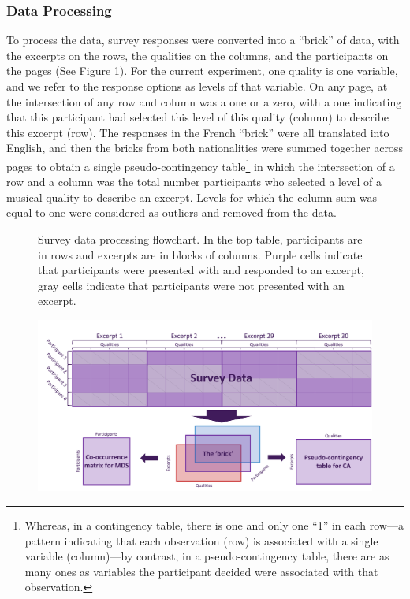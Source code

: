 \documentclass[
  english,
  man]{apa6}
\begin{document}
\hypertarget{data-processing}{%
\subsubsection{Data Processing}\label{data-processing}}

To process the data, survey responses were converted into a ``brick'' of data, with the excerpts on the rows, the qualities on the columns, and the participants on the pages (See Figure \ref{fig:dataflow}). For the current experiment, one quality is one variable, and we refer to the response options as levels of that variable. On any page, at the intersection of any row and column was a one or a zero, with a one indicating that this participant had selected this level of this quality (column) to describe this excerpt (row). The responses in the French ``brick'' were all translated into English, and then the bricks from both nationalities were summed together across pages to obtain a single pseudo-contingency table\footnote{Whereas, in a contingency table, there is one and only one ``1'' in each row---a pattern indicating that each observation (row) is associated with a single variable (column)---by contrast, in a pseudo-contingency table, there are as many ones as variables the participant decided were associated with that observation.} in which the intersection of a row and a column was the total number participants who selected a level of a musical quality to describe an excerpt. Levels for which the column sum was equal to one were considered as outliers and removed from the data.

\begin{figure}   
  \centering  
  \caption{Survey data processing flowchart. In the top table, participants are in rows and excerpts are in blocks of columns. Purple cells indicate that participants were presented with and responded to an excerpt, gray cells indicate that participants were not presented with an excerpt.}
    \includegraphics[width=1\columnwidth]{./Music-Descriptor-Space_files/figure-latex/dataflow.png}
  \label{fig:dataflow}
  \caption*{\footnotesize }
\end{figure}
\end{document}
